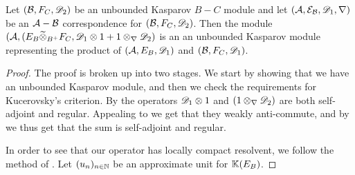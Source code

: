 \begin{theorem}
	Let $(\mathcal{B},F_C,\mathscr{D}_2)$ be an unbounded Kasparov $B-C$ module and let $(\mathcal{A},\mathcal{E}_{\mathcal{B}},\mathscr{D}_1,\nabla)$ be an $\mathcal{A}-\mathcal{B}$ correspondence for $(\mathcal{B},F_C,\mathscr{D}_2)$. Then the module $(\mathcal{A},(E_B\widetilde{\otimes}_{B^+} F_C,\mathscr{D}_1\otimes 1+1\otimes_\nabla \mathscr{D}_2)$ is an an unbounded Kasparov module representing the product of $(\mathcal{A},E_B,\mathscr{D}_1)$ and $(\mathcal{B},F_C,\mathscr{D}_1)$. 
\end{theorem}
\begin{proof}
	The proof is broken up into two stages. We start by showing that we have an unbounded Kasparov module, and then we check the requirements for Kucerovsky's criterion. 
	By  the operators $\mathscr{D}_1\otimes 1$ and $(1\otimes_\nabla \mathscr{D}_2)$ are both self-adjoint and regular. Appealing to  we get that they weakly anti-commute, and by  we thus get that the sum is self-adjoint and regular. 
	
	In order to see that our operator has locally compact resolvent, we follow the method of \cite{unboundkasp}. 
	Let $(u_n)_{n\in \mathbb{N}}$ be an approximate unit for $\mathbb{K}(E_B)$. 
	

\end{proof}
